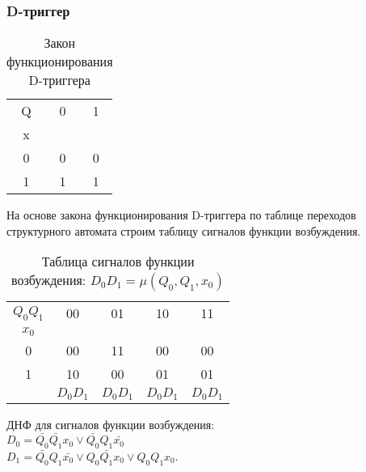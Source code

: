 \documentclass[a4paper,10pt]{article}
\begin{document}
        \subsubsection*{D-триггер}
            \begin{table}[h!]
                \center
                \begin{tabular}{|c|c|c|}
                    \hline
                     Q & 0 & 1 \\
                     x &   &   \\ \hline
                     0 & 0 & 0 \\ \hline
                     1 & 1 & 1 \\ \hline
                \end{tabular}
                \caption{Закон функционирования D-триггера}
            \end{table}

            На основе закона функционирования D-триггера по таблице переходов структурного автомата
            строим таблицу сигналов функции возбуждения. \\

            \begin{table}[h!]
                \center
                    \begin{tabular}{|c|c|c|c|c|}
                        \hline
                         $Q_0Q_1$ & 00       & 01       & 10       & 11 \\ 
                         $x_0$    &          &          &          &    \\ \hline
                             0    & 00       & 11       & 00       & 00 \\ \hline 
                             1    & 10       & 00       & 01       & 01 \\ \hline
                                  & $D_0D_1$ & $D_0D_1$ & $D_0D_1$ & $D_0D_1$ \\ \hline
                    \end{tabular}
                \caption{Таблица сигналов функции возбуждения: $D_0D_1 = \mu(Q_0,Q_1,x_0)$}
            \end{table}

            ДНФ для сигналов функции возбуждения: \\
                $D_0 = \bar{Q_0} \bar{Q_1} x_0 \lor \bar{Q_0} Q_1 \bar{x_0}$ \\
                $D_1 = \bar{Q_0} Q_1 \bar{x_0} \lor Q_0 \bar{Q_1} x_0 \lor Q_0 Q_1 x_0$.
\end{document}
